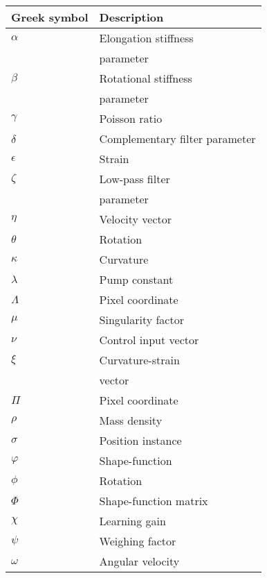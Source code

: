 \begin{spacing}{0.9}
\begin{multicols}{2}
\begin{table}[H]
\centering
    \begin{tabular}{p{2.7cm} p{3.8cm}} \hline
    \textbf{Greek symbol}    &   \textbf{Description }\\ \hline
    $\alpha$      & Elongation stiffness\\
                  & parameter  \\
    $\beta$       & Rotational stiffness \\
                  & parameter  \\
    $\gamma$      & Poisson ratio \\
    $\delta$      & Complementary filter parameter \\
    $\epsilon$    & Strain \\
    $\zeta$       & Low-pass filter \\
                  & parameter  \\
    $\eta$        & Velocity vector \\
    $\theta$      & Rotation \\
    $\kappa$      & Curvature \\
    $\lambda$     & Pump constant \\
    $\Lambda$     & Pixel coordinate \\
    $\mu$         & Singularity factor \\
    $\nu$         & Control input vector \\
    $\xi$         & Curvature-strain  \\
                  & vector  \\
    $\Pi$         & Pixel coordinate \\
    $\rho$        & Mass density \\
    $\sigma$      & Position instance \\
    $\varphi$     & Shape-function \\
    $\phi$        & Rotation  \\
    $\Phi$        & Shape-function matrix \\
    $\chi$        & Learning gain \\
    $\psi$        & Weighing factor \\
    $\omega$      & Angular velocity \\ \hline
    \end{tabular}
\end{table}



\end{multicols}
\end{spacing}
